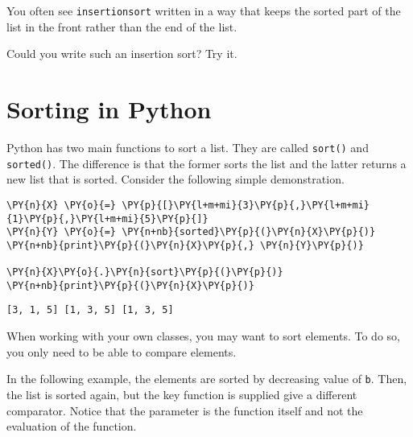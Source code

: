 You often see \texttt{insertionsort} written in a way that keeps the sorted part of the list in the front rather than the end of the list.  


Could you write such an insertion sort?  Try it.

\section{Sorting in Python}


Python has two main functions to sort a list.  They are called \texttt{sort()} and \texttt{sorted()}.  The difference is that the former sorts the list and the latter returns a new list that is sorted.  Consider the following simple demonstration.

\begin{Verbatim}[commandchars=\\\{\}]
\PY{n}{X} \PY{o}{=} \PY{p}{[}\PY{l+m+mi}{3}\PY{p}{,}\PY{l+m+mi}{1}\PY{p}{,}\PY{l+m+mi}{5}\PY{p}{]}
\PY{n}{Y} \PY{o}{=} \PY{n+nb}{sorted}\PY{p}{(}\PY{n}{X}\PY{p}{)}
\PY{n+nb}{print}\PY{p}{(}\PY{n}{X}\PY{p}{,} \PY{n}{Y}\PY{p}{)}

\PY{n}{X}\PY{o}{.}\PY{n}{sort}\PY{p}{(}\PY{p}{)}
\PY{n+nb}{print}\PY{p}{(}\PY{n}{X}\PY{p}{)}
\end{Verbatim}


\texttt{[3, 1, 5] [1, 3, 5]
[1, 3, 5]
}


When working with your own classes, you may want to sort elements.  To do so, you only need to be able to compare elements.


In the following example, the elements are sorted by decreasing value of \texttt{b}.  Then, the list is sorted again, but the key function is supplied give a different comparator.  Notice that the parameter is the function itself and not the evaluation of the function.

